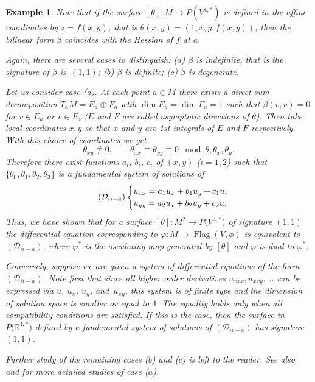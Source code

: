\documentclass[10pt,a4paper]{amsart}
\newcommand{\R}{\mathbb R}
\newcommand{\cD}{\mathcal D}
\newcommand{\Flag}{\operatorname{Flag}}
\newtheorem{ex}[thm]{Example}
\numberwithin{equation}{section}
\begin{document}
\begin{ex}
Note that if the surface $[\theta]\colon M\to P(V^{4,*})$ is defined in the affine coordinates by $z=f(x,y)$, that is $\theta(x,y)=(1,x,y,f(x,y))$, then the bilinear form $\beta$ coincides with the Hessian of $f$ at $a$.

Again, there are several cases to distinguish: ($a$) $\beta$ is indefinite, that is the signature of $\beta$ is~$(1,1)$; ($b$) $\beta$ is definite; ($c$) $\beta$ is degenerate.

Let us consider case (a). At each point $a\in M$ there exists a direct sum decomposition $T_aM=E_a\oplus F_a$ wtih $\dim E_a=\dim F_a=1$ such that $\beta(v,v)=0$ for $v\in E_a$ or $v\in F_a$ ($E$ and $F$ are called asymptotic directions of $\theta$). Then take local coordinates $x,y$ so that $x$ and $y$ are 1st integrals of $E$ and $F$ respectively. With this choice of coordinates we get
\[
\theta_{xy} \not\equiv 0, \qquad \theta_{xx}\equiv\theta_{yy}\equiv 0 \mod \theta,\theta_x,\theta_y.
\]
Therefore there exist functions $a_i$, $b_i$, $c_i$ of $(x,y)$ ($i=1,2$) such that $\{\theta_0,\theta_1,\theta_2,\theta_3\}$ is a fundamental system of solutions of
\begin{equation}
\tag{$\cD_{ii-a}$}
\begin{cases}
u_{xx} = a_1u_x+b_1u_y+c_1u,
\\
u_{yy} = a_2u_x+b_2u_y+c_2u.
\end{cases}
\end{equation}
Thus, we have shown that for a surface $[\theta]\colon M^2\to P\big(V^{4,*}\big)$ of signature $(1,1)$ the differential equation corresponding to $\varphi\colon M\to \Flag(V,\phi)$ is equivalent to $(\cD_{ii-a})$, where $\varphi^*$ is the osculating map generated by $[\theta]$ and $\varphi$ is dual to $\varphi^*$.

Conversely, suppose we are given a system of differential equations of the form $(\cD_{ii-a})$. Note first that since all higher order derivatives $u_{xxx}, u_{xxy}, \dots $ can be expressed via $u$, $u_x$, $u_y$, and~$u_{xy}$, this system is of finite type and the dimension of solution space is smaller or equal to $4$. The equality holds only when all compatibility conditions are satisfied. If this is the case, then the surface in $P\big(\R^{4,*}\big)$ defined by a fundamental system of solutions of $(\cD_{ii-a})$ has signature~$(1,1)$.

Further study of the remaining cases ($b$) and ($c$) is left to the reader. See also~\cite{wilch2} and \cite{sasaki2, sasaki1} for more detailed studies of case ($a$).


\end{ex}
\end{document}
